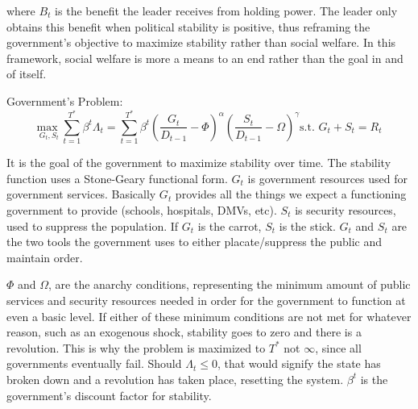 \documentclass[12pt]{article}
\begin{document}
\begin{spacing}{1.5}
\noindent where $B_t$ is the benefit the leader receives from holding power. The leader only obtains this benefit when political stability is positive, thus reframing the government's objective to maximize stability rather than social welfare. In this framework, social welfare is more a means to an end rather than the goal in and of itself. 



\vspace{.5 em}

\noindent Government's Problem:
\begin{equation}
{\underset{G_t,S_t}{\text{max }}} \sum\limits_{t=1}^{T^*} \beta^t {\Lambda}_t = \sum\limits_{t=1}^{T^*} \beta^t\left(\frac{G_t}{D_{t-1}}-\Phi\right)^\alpha \left(\frac{S_t}{D_{t-1}}-\Omega\right)^\gamma   \text{s.t. } G_t+S_t=R_t
\end{equation}

It is the goal of the government to maximize stability over time. The stability function uses a Stone-Geary functional form. $G_t$ is government resources used for government services. Basically $G_t$ provides all the things we expect a functioning government to provide (schools, hospitals, DMVs, etc). $S_t$ is security resources, used to suppress the population. If $G_t$ is the carrot, $S_t$ is the stick. $G_t$ and $S_t$ are the two tools the government uses to either placate/suppress the public and maintain order. 


$\Phi$ and $\Omega$, are the anarchy conditions, representing the minimum amount of public services and security resources needed in order for the government to function at even a basic level. If either of these minimum conditions are not met for whatever reason, such as an exogenous shock, stability goes to zero and there is a revolution. This is why the problem is maximized to $T^*$ not $\infty$, since all governments eventually fail. Should $\Lambda_t \leq 0$, that would signify the state has broken down and a revolution has taken place, resetting the system. $\beta^t$ is the government's discount factor for stability. 


\end{spacing}
\end{document}
